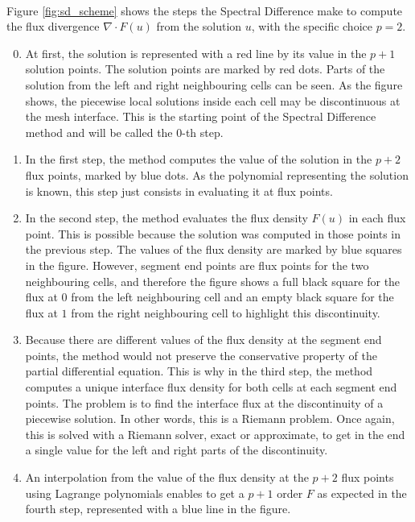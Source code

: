       \paragraph{}
      Figure \ref{fig:sd_scheme} shows the steps the Spectral Difference make to compute the flux divergence $\nabla \cdot F\left(u\right)$ from the solution $u$, with the specific choice $p = 2$.
      \begin{enumerate}
        \setcounter{enumi}{-1}
        \item At first, the solution is represented with a red line by its value in the $p + 1$ solution points.
        The solution points are marked by red dots.
        Parts of the solution from the left and right neighbouring cells can be seen.
        As the figure shows, the piecewise local solutions inside each cell may be discontinuous at the mesh interface.
        This is the starting point of the Spectral Difference method and will be called the 0-th step.
        \item In the first step, the method computes the value of the solution in the $p + 2$ flux points, marked by blue dots.
        As the polynomial representing the solution is known, this step just consists in evaluating it at flux points.
        \item In the second step, the method evaluates the flux density $F\left(u\right)$ in each flux point.
        This is possible because the solution was computed in those points in the previous step.
        The values of the flux density are marked by blue squares in the figure.
        However, segment end points are flux points for the two neighbouring cells, and therefore the figure shows a full black square for the flux at $0$ from the left neighbouring cell and an empty black square for the flux at $1$ from the right neighbouring cell to highlight this discontinuity.
        \item Because there are different values of the flux density at the segment end points, the method would not preserve the conservative property of the partial differential equation.
        This is why in the third step, the method computes a unique interface flux density for both cells at each segment end points.
        The problem is to find the interface flux at the discontinuity of a piecewise solution.
        In other words, this is a Riemann problem.
        Once again, this is solved with a Riemann solver, exact or approximate, to get in the end a single value for the left and right parts of the discontinuity.
        \item An interpolation from the value of the flux density at the $p+2$ flux points using Lagrange polynomials enables to get a $p+1$ order $F$ as expected in the fourth step, represented with a blue line in the figure.

\end{enumerate}
